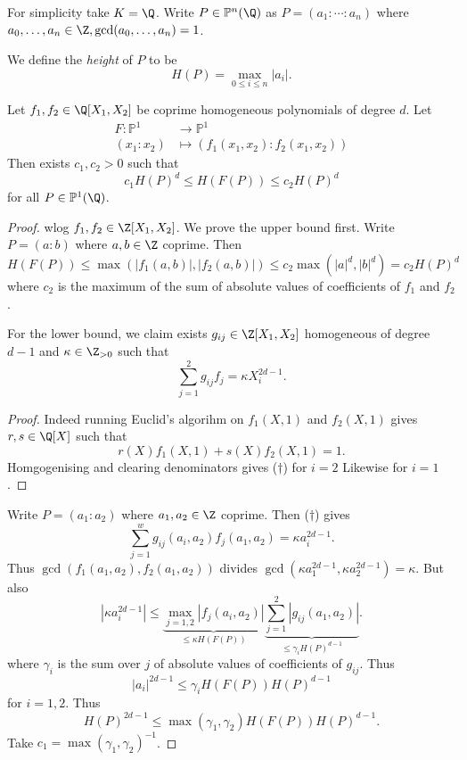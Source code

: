 \documentclass[a4paper]{article}
\theoremstyle{definition}
\theoremstyle{theorem}
\renewcommand*{\P}{\mathbb{P}}
\begin{document}
For simplicity take \(K = \Q\). Write \(P \in \P^n(\Q)\) as \(P = (a_1: \cdots: a_n)\) where \(a_0, \dots, a_n \in \Z, \gcd(a_0, \dots, a_n) = 1\).

\begin{definition}[height]
  We define the \emph{height} of \(P\) to be
  \[
    H(P) = \max_{0 \leq i \leq n} |a_i|.
  \]
\end{definition}

\begin{lemma}
  Let \(f_1, f_2 \in \Q[X_1, X_2]\) be coprime homogeneous polynomials of degree \(d\). Let
  \begin{align*}
    F: \P^1 &\to \P^1 \\
    (x_1: x_2) &\mapsto (f_1(x_1, x_2): f_2(x_1, x_2))
  \end{align*}
  Then exists \(c_1, c_2 > 0\) such that
  \[
    c_1 H(P)^d \leq H(F(P)) \leq c_2 H(P)^d
  \]
  for all \(P \in \P^1(\Q)\).
\end{lemma}

\begin{proof}
  wlog \(f_1, f_2 \in \Z[X_1, X_2]\). We prove the upper bound first. Write \(P = (a: b)\) where \(a, b \in \Z\) coprime. Then
  \[
    H(F(P))
    \leq \max(|f_1(a, b)|, |f_2(a, b)|)
    \leq c_2 \max(|a|^d, |b|^d)
    = c_2 H(P)^d
  \]
  where \(c_2\) is the maximum of the sum of absolute values of coefficients of \(f_1\) and \(f_2\).

  For the lower bound, we claim exists \(g_{ij} \in \Z[X_1, X_2]\) homogeneous of degree \(d - 1\) and \(\kappa \in \Z_{> 0}\) such that
  \[
    \sum_{j = 1}^2 g_{ij}f_j = \kappa  X_i^{2d - 1}.
    \tag{\(\dagger\)}
  \]
  \begin{proof}
    Indeed running Euclid's algorihm on \(f_1(X, 1)\) and \(f_2(X, 1)\) gives \(r, s \in \Q[X]\) such that
    \[
      r(X) f_1(X, 1) + s(X) f_2(X, 1) = 1.
    \]
    Homgogenising and clearing denominators gives (\(\dagger\)) for \(i = 2\) Likewise for \(i = 1\).
  \end{proof}

  Write \(P = (a_1: a_2)\) where \(a_1, a_2 \in \Z\) coprime. Then (\(\dagger\)) gives
  \[
    \sum_{j = 1}^w g_{ij}(a_i, a_2) f_j(a_1, a_2) = \kappa a_i^{2d - 1}.
  \]
  Thus \(\gcd(f_1(a_1, a_2), f_2(a_1, a_2))\) divides \(\gcd(\kappa a_1^{2d - 1}, \kappa a_2^{2d - 1}) = \kappa\). But also
  \[
    |\kappa a_i^{2d - 1}| \leq \underbrace{\max_{j = 1, 2} |f_j (a_i, a_2)|}_{\leq \kappa H(F(P))} \underbrace{\sum_{j = 1}^2 |g_{ij}(a_1, a_2)|}_{\leq \gamma_i H(P)^{d - 1}}.
  \]
  where \(\gamma_i\) is the sum over \(j\) of absolute values of coefficients of \(g_{ij}\). Thus
  \[
    |a_i|^{2d - 1} \leq \gamma_i H(F(P)) H(P)^{d - 1}
  \]
  for \(i = 1, 2\). Thus
  \[
    H(P)^{2d - 1} \leq \max(\gamma_1, \gamma_2) H(F(P)) H(P)^{d - 1}.
  \]
  Take \(c_1 = \max(\gamma_1, \gamma_2)^{-1}\).
\end{proof}
\end{document}
